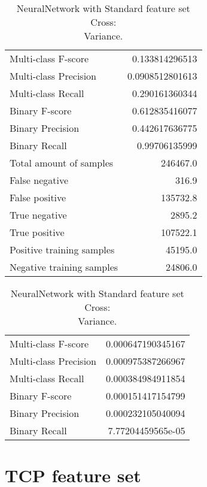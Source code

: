 \begin{table}[H]
\begin{minipage}{0.5\textwidth}
\caption{NeuralNetwork with Standard feature set Cross: \\Average.}
\centering
\begin{tabular}{l r}
\toprule
Multi-class F-score & 0.133814296513 \\
Multi-class Precision & 0.0908512801613 \\
Multi-class Recall & 0.290161360344 \\
\midrule
Binary F-score & 0.612835416077 \\
Binary Precision & 0.442617636775 \\
Binary Recall & 0.99706135999 \\
\midrule
Total amount of samples & 246467.0 \\
False negative & 316.9 \\
False positive & 135732.8 \\
True negative & 2895.2 \\
True positive & 107522.1 \\
\midrule
Positive training samples & 45195.0 \\
Negative training samples & 24806.0 \\
\bottomrule
\end{tabular}
\end{minipage}
\hfillx
\begin{minipage}{0.5\textwidth}
\caption{NeuralNetwork with Standard feature set Cross: \\Variance.}
\centering
\begin{tabular}{l r}
\toprule
Multi-class F-score & 0.000647190345167 \\
Multi-class Precision & 0.000975387266967 \\
Multi-class Recall & 0.000384984911854 \\
\midrule
Binary F-score & 0.000151417154799 \\
Binary Precision & 0.000232105040094 \\
Binary Recall & 7.77204459565e-05 \\
\bottomrule
\end{tabular}
\end{minipage}
\end{table}

\newpage
\section{TCP feature set}

